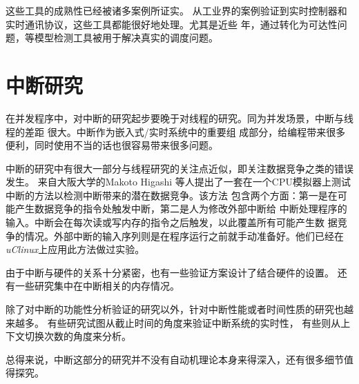 这些工具的成熟性已经被诸多案例所证实。\cite{D'Argenio:1997:BRP:646481.691445,Ernits:2005:MAS:1124427.1124429,Hen05a,Jensen:2000:SUU:646846.706958,Lamport:2005:RMC:2156375.2156396,Larsen:2005:TRE:1086228.1086283,Lindahl:1998:FDA:646482.691449}
从工业界的案例验证到实时控制器和实时通讯协议，这些工具都能很好地处理。尤其是近些
年，通过转化为可达性问题，\uppaal 等模型检测工具被用于解决真实的调度问题。
\cite{Abdeddaim:1,Fehnker:811256,Hune:2001:GSC:774194.774198,Bouyer06timedunfoldings}

\section{中断研究}
\label{sec:intr_study}

在并发程序中，对中断的研究起步要晚于对线程的研究。同为并发场景，中断与线程的差距
很大。\cite{Regehr:2007:IVV:1268075.1268150}中断作为嵌入式/实时系统中的重要组
成部分，给编程带来很多便利，同时使用不当的话也很容易带来很多问题。\cite{Lee:2007:HRE:1534850}

中断的研究中有很大一部分与线程研究的关注点近似，即关注数据竞争之类的错误发生。
\cite{6004502, DBLP:journals/ijdsn/TchamgoueKJ13}来自大阪大学的Makoto Higashi
等人提出了一套在一个CPU模拟器上测试中断的方法以检测中断带来的潜在数据竞争。该方法
包含两个方面：第一是在可能产生数据竞争的指令处触发中断，第二是人为修改外部中断给
中断处理程序的输入。中断会在每次读或写内存的指令之后触发，以此覆盖所有可能产生数
据竞争的情况。外部中断的输入序列则是在程序运行之前就手动准备好。他们已经在
\emph{uClinux}上应用此方法做过实验。\cite{Higashi:2010:EMC:1808266.1808278}

由于中断与硬件的关系十分紧密，也有一些验证方案设计了结合硬件的设置。\cite{Yang:4261310}
还有一些研究集中在中断相关的内存情况。\cite{Chatterjee:2003:SSA:1760267.1760276}

除了对中断的功能性分析验证的研究以外，针对中断性能或者时间性质的研究也越来越多。
有些研究试图从截止时间的角度来验证中断系统的实时性\cite{10.1109/TSE.2004.64}，
有些则从上下文切换次数的角度来分析\cite{6148915}。

总得来说，中断这部分的研究并不没有自动机理论本身来得深入，还有很多细节值得探究。


